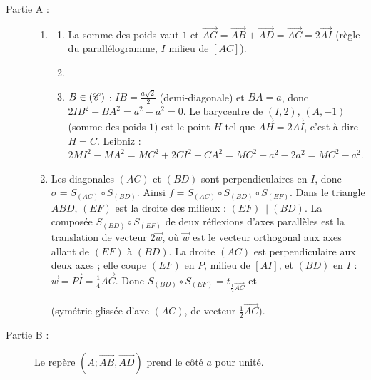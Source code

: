 \begin{description}
	\item[Partie A :]
	\begin{enumerate}
		\item
		\begin{enumerate}
			\item {}
				La somme des poids vaut $1$ et $\overrightarrow{AG} = \overrightarrow{AB} + \overrightarrow{AD} = \overrightarrow{AC} = 2\overrightarrow{AI}$ (règle du parallélogramme, $I$ milieu de $[AC]$).
				\par\noindent{}
			\item {}
			\item {}
				$B \in (\mathscr{C})$ : $IB = \frac{a\sqrt{2}}{2}$ (demi-diagonale) et $BA = a$, donc $2IB^2 - BA^2 = a^2 - a^2 = 0$.
				Le barycentre de $(I,2)$, $(A,-1)$ (somme des poids $1$) est le point $H$ tel que $\overrightarrow{AH} = 2\overrightarrow{AI}$, c'est-à-dire $H = C$.
				Leibniz : $2MI^2 - MA^2 = MC^2 + 2CI^2 - CA^2 = MC^2 + a^2 - 2a^2 = MC^2 - a^2$.
				\par\noindent{}
		\end{enumerate}
		\item {}
			Les diagonales $(AC)$ et $(BD)$ sont perpendiculaires en $I$, donc $\sigma = S_{(AC)} \circ S_{(BD)}$. Ainsi
			$f = S_{(AC)} \circ S_{(BD)} \circ S_{(EF)}$.
			Dans le triangle $ABD$, $(EF)$ est la droite des milieux : $(EF) \parallel (BD)$. La composée $S_{(BD)} \circ S_{(EF)}$ de deux réflexions d'axes parallèles est la translation de vecteur $2\vec{w}$,
			où $\vec{w}$ est le vecteur orthogonal aux axes allant de $(EF)$ à $(BD)$.
			La droite $(AC)$ est perpendiculaire aux deux axes ; elle coupe $(EF)$ en $P$, milieu de $[AI]$, et $(BD)$ en $I$ : $\vec{w} = \overrightarrow{PI} = \frac{1}{4}\overrightarrow{AC}$.
			Donc $S_{(BD)} \circ S_{(EF)} = t_{\frac{1}{2}\overrightarrow{AC}}$ et
			\par\noindent{}
			(symétrie glissée d'axe $(AC)$, de vecteur $\frac{1}{2}\overrightarrow{AC}$).
	\end{enumerate}
	\item[Partie B :] Le repère $(A;\overrightarrow{AB},\overrightarrow{AD})$ prend le côté $a$ pour unité.

\end{description}
